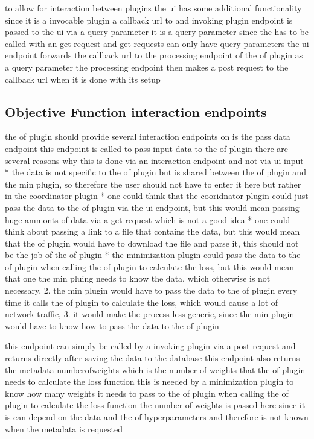 \documentclass[
  a4paper,  %
  twoside,  %
  bibliography=totoc,
  headsepline,
  cleardoublepage=empty,
  parskip=half,
  draft=false
]{scrbook}
\begin{document}
to allow for interaction between plugins the ui has some additional functionality
since it is a invocable plugin a callback url to and invoking plugin endpoint is passed to the ui via a query parameter
it is a query parameter since the has to be called with an get request and get requests can only have query parameters
the ui endpoint forwards the callback url to the processing endpoint of the of plugin as a query parameter
the processing endpoint then makes a post request to the callback url when it is done with its setup

\subsection{Objective Function interaction endpoints}
\label{subsec:objectiveFunctionInteractionEndpoints}
the of plugin should provide several interaction endpoints
on is the pass data endpoint
this endpoint is called to pass input data to the of plugin
there are several reasons why this is done via an interaction endpoint and not via ui input
* the data is not specific to the of plugin but is shared between the of plugin and the min plugin, so therefore the user should not have to enter it here but rather in the coordinator plugin
* one could think that the cooridnator plugin could just pass the data to the of plugin via the ui endpoint, but this would mean passing huge ammonts of data via a get request which is not a good idea
* one could think about passing a link to a file that contains the data, but this would mean that the of plugin would have to download the file and parse it, this should not be the job of the of plugin
* the minimization plugin could pass the data to the of plugin when calling the of plugin to calculate the loss, but this would mean that one the min pluing needs to know the data, which otherwise is not necessary, 2. the min plugin would have to pass the data to the of plugin every time it calls the of plugin to calculate the loss, which would cause a lot of network traffic, 3. it would make the process less generic, since the min plugin would have to know how to pass the data to the of plugin

this endpoint can simply be called by a invoking plugin via a post request and returns directly after saving the data to the database
this endpoint also returns the metadata numberofweights which is the number of weights that the of plugin needs to calculate the loss function
this is needed by a minimization plugin to know how many weights it needs to pass to the of plugin when calling the of plugin to calculate the loss function
the number of weights is passed here since it is can depend on the data and the of hyperparameters and therefore is not known when the metadata is requested
\end{document}
